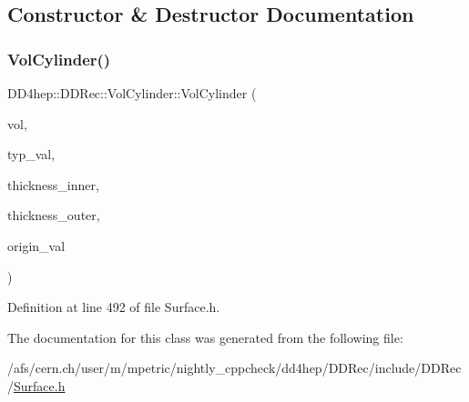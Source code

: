 \subsection{Constructor \& Destructor Documentation}
\hypertarget{class_d_d4hep_1_1_d_d_rec_1_1_vol_cylinder_ae559c0cb9b5a969ba0f14db3d419d376}{}\label{class_d_d4hep_1_1_d_d_rec_1_1_vol_cylinder_ae559c0cb9b5a969ba0f14db3d419d376} 
\subsubsection{\texorpdfstring{Vol\+Cylinder()}{VolCylinder()}}
{\footnotesize\ttfamily D\+D4hep\+::\+D\+D\+Rec\+::\+Vol\+Cylinder\+::\+Vol\+Cylinder (\begin{DoxyParamCaption}\item[{\hyperlink{class_d_d4hep_1_1_geometry_1_1_volume}{Geometry\+::\+Volume}}]{vol,  }\item[{\hyperlink{class_d_d_surfaces_1_1_surface_type}{Surface\+Type}}]{typ\+\_\+val,  }\item[{double}]{thickness\+\_\+inner,  }\item[{double}]{thickness\+\_\+outer,  }\item[{\hyperlink{class_d_d_surfaces_1_1_vector3_d}{Vector3D}}]{origin\+\_\+val }\end{DoxyParamCaption})\hspace{0.3cm}{\ttfamily [inline]}}



Definition at line 492 of file Surface.\+h.



The documentation for this class was generated from the following file\+:\begin{DoxyCompactItemize}
\item 
/afs/cern.\+ch/user/m/mpetric/nightly\+\_\+cppcheck/dd4hep/\+D\+D\+Rec/include/\+D\+D\+Rec/\hyperlink{_surface_8h}{Surface.\+h}\end{DoxyCompactItemize}

